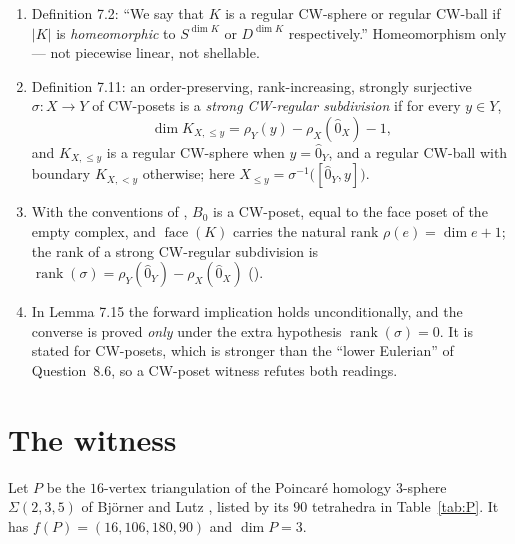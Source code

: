 \documentclass[11pt]{amsart}
\theoremstyle{definition}
\theoremstyle{remark}
\DeclareMathOperator{\rank}{rank}
\newcommand{\face}{\operatorname{face}}
\newcommand{\Ohat}{\widehat{0}}
\begin{document}
\begin{enumerate}
\item[(D1)] Definition 7.2: ``We say that $K$ is a regular CW-sphere or regular CW-ball if
  $|K|$ is \emph{homeomorphic} to $S^{\dim K}$ or $D^{\dim K}$ respectively.''
  Homeomorphism only --- not piecewise linear, not shellable.
\item[(D2)] Definition 7.11: an order-preserving, rank-increasing, strongly surjective
  $\sigma\colon X\to Y$ of CW-posets is a \emph{strong CW-regular subdivision} if for every
  $y\in Y$,
  \[
    \dim K_{X,\le y}=\rho_Y(y)-\rho_X(\Ohat_X)-1,
  \]
  and $K_{X,\le y}$ is a regular CW-sphere when $y=\Ohat_Y$, and a regular CW-ball with
  boundary $K_{X,<y}$ otherwise; here $X_{\le y}=\sigma^{-1}\bigl([\Ohat_Y,y]\bigr)$.
\item[(D3)] With the conventions of \cite[\S7.1]{Stapledon}, $B_0$ is a CW-poset, equal to
  the face poset of the empty complex, and $\face(K)$ carries the natural rank
  $\rho(e)=\dim e+1$; the rank of a strong CW-regular subdivision is
  $\rank(\sigma)=\rho_Y(\Ohat_Y)-\rho_X(\Ohat_X)$ (\cite[\S7.2]{Stapledon}).
\item[(D4)] In Lemma 7.15 the forward implication holds unconditionally, and the converse
  is proved \emph{only} under the extra hypothesis $\rank(\sigma)=0$. It is stated for
  CW-posets, which is stronger than the ``lower Eulerian'' of Question~8.6, so a CW-poset
  witness refutes both readings.
\end{enumerate}

\section{The witness}\label{sec:witness}

Let $P$ be the $16$-vertex triangulation of the Poincar\'e homology $3$-sphere
$\Sigma(2,3,5)$ of Bj\"orner and Lutz \cite{BL}, listed by its $90$ tetrahedra in
Table~\ref{tab:P}. It has $f(P)=(16,106,180,90)$ and $\dim P=3$.
\end{document}
